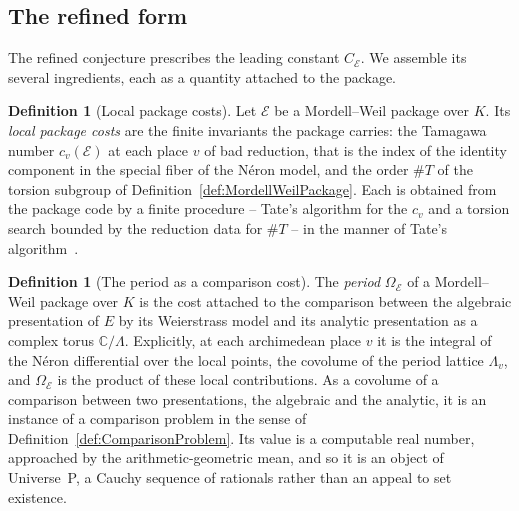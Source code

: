 \documentclass[10pt, reqno]{amsart}
\theoremstyle{plain}
\theoremstyle{definition}
\newtheorem{definition}[theorem]{Definition}
\theoremstyle{plain}
\newcommand{\C}{\mathbb{C}}
\begin{document}
\subsection{The refined form}\label{subsec:BSDRefined}

The refined conjecture prescribes the leading constant $C_{\mathcal{E}}$. We assemble its several ingredients, each as a quantity attached to the package.

\begin{definition}[Local package costs]\label{def:LocalPackageCosts}
Let $\mathcal{E}$ be a Mordell--Weil package over $K$. Its \emph{local package costs} are the finite invariants the package carries: the Tamagawa number $c_v(\mathcal{E})$ at each place $v$ of bad reduction, that is the index of the identity component in the special fiber of the N\'eron model, and the order $\# T$ of the torsion subgroup of Definition~\ref{def:MordellWeilPackage}. Each is obtained from the package code by a finite procedure -- Tate's algorithm for the $c_v$ and a torsion search bounded by the reduction data for $\# T$ -- in the manner of Tate's algorithm~\cite{SilvermanAEC, Cremona1997}.
\end{definition}

\begin{definition}[The period as a comparison cost]\label{def:PeriodAsTransport}
The \emph{period} $\Omega_{\mathcal{E}}$ of a Mordell--Weil package over $K$ is the cost attached to the comparison between the algebraic presentation of $E$ by its Weierstrass model and its analytic presentation as a complex torus $\C / \Lambda$. Explicitly, at each archimedean place $v$ it is the integral of the N\'eron differential over the local points, the covolume of the period lattice $\Lambda_v$, and $\Omega_{\mathcal{E}}$ is the product of these local contributions. As a covolume of a comparison between two presentations, the algebraic and the analytic, it is an instance of a comparison problem in the sense of Definition~\ref{def:ComparisonProblem}. Its value is a computable real number, approached by the arithmetic-geometric mean, and so it is an object of Universe~P, a Cauchy sequence of rationals rather than an appeal to set existence.
\end{definition}
\end{document}
